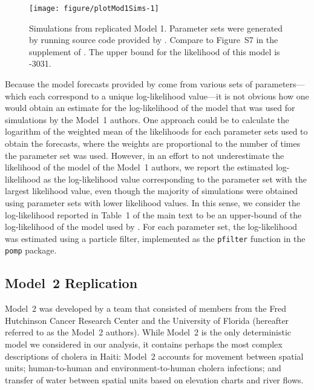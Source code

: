 \begin{figure}[!h]
\begin{knitrout}
\color{fgcolor}
\texttt{[image: figure/plotMod1Sims-1]} 
\end{knitrout}
\caption[Simulations from replicated Model 1.]{\label{fig:plotMod1Sims}
Simulations from replicated Model 1. Parameter sets were generated by running source code provided by \citet{lee20}. Compare to Figure~S7 in the supplement of \citet{lee20}. The upper bound for the likelihood of this model is -3031.
}
\end{figure}

Because the model forecasts provided by \citet{lee20} come from various sets of parameters---which each correspond to a unique log-likelihood value---it is not obvious how one would obtain an estimate for the log-likelihood of the model that was used for simulations by the Model~1 authors.
One approach could be to calculate the logarithm of the weighted mean of the likelihoods for each parameter sets used to obtain the forecasts, where the weights are proportional to the number of times the parameter set was used.
However, in an effort to not underestimate the likelihood of the model of the Model~1 authors, we report the estimated log-likelihood as the log-likelihood value corresponding to the parameter set with the largest likelihood value, even though the majority of simulations were obtained using parameter sets with lower likelihood values.
In this sense, we consider the log-likelihood reported in Table~1 of the main text to be an upper-bound of the log-likelihood of the model used by \citet{lee20}.
For each parameter set, the log-likelihood was estimated using a particle filter, implemented as the \texttt{pfilter} function in the \texttt{pomp} package.

\subsection{Model~2 Replication}\label{sec:mod2rep}

Model~2 was developed by a team that consisted of members from the Fred Hutchinson Cancer Research Center and the University of Florida (hereafter referred to as the Model~2 authors).
While Model~2 is the only deterministic model we considered in our analysis, it contains perhaps the most complex descriptions of cholera in Haiti: Model~2 accounts for movement between spatial units; human-to-human and environment-to-human cholera infections; and transfer of water between spatial units based on elevation charts and river flows.

